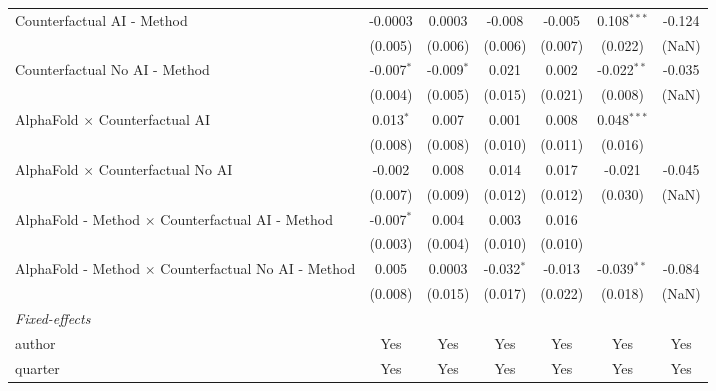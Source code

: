 \begin{tabular}{lcccccc}
   Counterfactual AI - Method                                 & -0.0003      & 0.0003       & -0.008       & -0.005  & 0.108$^{***}$  & -0.124\\   
                                                              & (0.005)      & (0.006)      & (0.006)      & (0.007) & (0.022)        & (NaN)\\   
   Counterfactual No AI - Method                              & -0.007$^{*}$ & -0.009$^{*}$ & 0.021        & 0.002   & -0.022$^{**}$  & -0.035\\   
                                                              & (0.004)      & (0.005)      & (0.015)      & (0.021) & (0.008)        & (NaN)\\   
   AlphaFold $\times$ Counterfactual AI                       & 0.013$^{*}$  & 0.007        & 0.001        & 0.008   & 0.048$^{***}$  &   \\   
                                                              & (0.008)      & (0.008)      & (0.010)      & (0.011) & (0.016)        &   \\   
   AlphaFold $\times$ Counterfactual No AI                    & -0.002       & 0.008        & 0.014        & 0.017   & -0.021         & -0.045\\   
                                                              & (0.007)      & (0.009)      & (0.012)      & (0.012) & (0.030)        & (NaN)\\   
   AlphaFold - Method $\times$ Counterfactual AI - Method     & -0.007$^{*}$ & 0.004        & 0.003        & 0.016   &                &   \\   
                                                              & (0.003)      & (0.004)      & (0.010)      & (0.010) &                &   \\   
   AlphaFold - Method $\times$ Counterfactual No AI - Method  & 0.005        & 0.0003       & -0.032$^{*}$ & -0.013  & -0.039$^{**}$  & -0.084\\   
                                                              & (0.008)      & (0.015)      & (0.017)      & (0.022) & (0.018)        & (NaN)\\   
   \midrule
   \emph{Fixed-effects}\\
   author                                                     & Yes          & Yes          & Yes          & Yes     & Yes            & Yes\\  
   quarter                                                    & Yes          & Yes          & Yes          & Yes     & Yes            & Yes\\  

\end{tabular}
